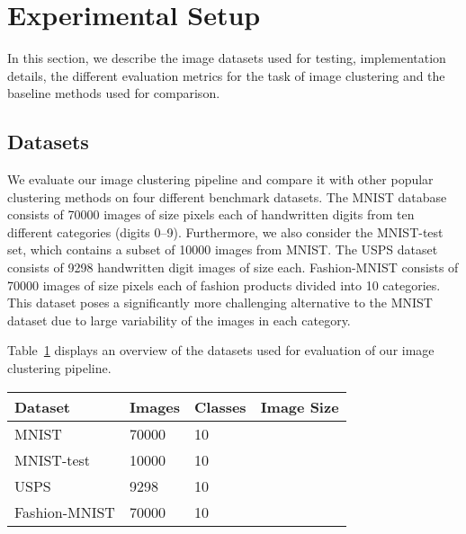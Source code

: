 \documentclass[11pt]{article}
\theoremstyle{definition}
\newcommand{\Table}[1]{Table~\ref{#1}}
\begin{document}
        

\section{Experimental Setup}\label{sec:experimental setup}

In this section, we describe the image datasets used for testing, implementation details, the different evaluation metrics for the task of image clustering and the baseline methods used for comparison.


\subsection{Datasets}

We evaluate our image clustering pipeline and compare it with other popular clustering methods on four different benchmark datasets. The MNIST \cite{LeCun_MnistDataset_1998} database consists of 70000 images of size  pixels each of handwritten digits from ten different categories (digits 0--9). Furthermore, we also consider the MNIST-test set, which contains a subset of 10000 images from MNIST. The USPS dataset \cite{Hull_USPSDataset_1994} consists of 9298 handwritten digit images of size  each. Fashion-MNIST \cite{Xiao_FashionMNIST_2017} consists of 70000 images of size  pixels each of fashion products divided into 10 categories. This dataset poses a significantly more challenging alternative to the MNIST dataset due to large variability of the images in each category.

\Table{table:image clustering datasets} displays an overview of the datasets used for evaluation of our image clustering pipeline.


\begin{table}
	\centering
	\label{table:image clustering datasets}
	\begin{tabular}{|llll|}
		\hline
		Dataset &  Images &  Classes & Image Size \\
		\hline
		MNIST \cite{LeCun_MnistDataset_1998} & 70000 & 10 &  \\
		MNIST-test \cite{LeCun_MnistDataset_1998} & 10000 & 10 &  \\
		USPS \cite{Hull_USPSDataset_1994} & 9298 & 10 &  \\
		Fashion-MNIST \cite{Xiao_FashionMNIST_2017} & 70000 & 10 &   \\
\hline
		
	\end{tabular}
\end{table}
      
\end{document}
